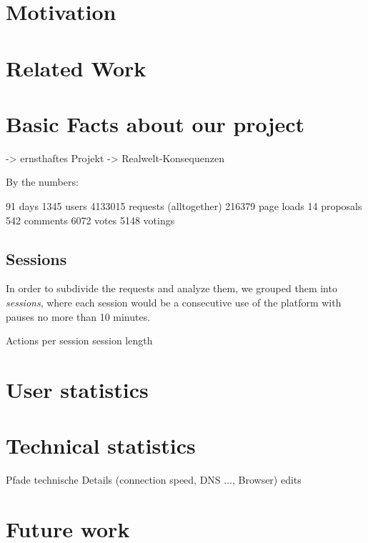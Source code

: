 



\section{Motivation}
\section{Related Work}
\section{Basic Facts about our project}

	-> ernsthaftes Projekt
	-> Realwelt-Konsequenzen

By the numbers:

91 days
1345 users
4133015 requests (alltogether)
216379 page loads
14 proposals
542 comments
6072 votes
5148 votings

\subsection{Sessions}

In order to subdivide the requests and analyze them, we grouped them into \textit{sessions}, where each session would be a consecutive use of the platform with pauses no more than 10 minutes.

Actions per session
session length


\section{User statistics}



\section{Technical statistics}

Pfade
technische Details (connection speed, DNS ..., Browser)
edits

\section{Future work}
